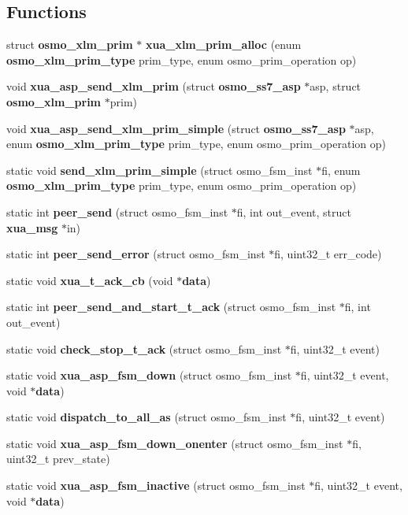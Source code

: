 \subsection*{Functions}
\begin{DoxyCompactItemize}
\item 
struct {\bf osmo\+\_\+xlm\+\_\+prim} $\ast$ {\bf xua\+\_\+xlm\+\_\+prim\+\_\+alloc} (enum {\bf osmo\+\_\+xlm\+\_\+prim\+\_\+type} prim\+\_\+type, enum osmo\+\_\+prim\+\_\+operation op)
\item 
void {\bf xua\+\_\+asp\+\_\+send\+\_\+xlm\+\_\+prim} (struct {\bf osmo\+\_\+ss7\+\_\+asp} $\ast$asp, struct {\bf osmo\+\_\+xlm\+\_\+prim} $\ast$prim)
\item 
void {\bf xua\+\_\+asp\+\_\+send\+\_\+xlm\+\_\+prim\+\_\+simple} (struct {\bf osmo\+\_\+ss7\+\_\+asp} $\ast$asp, enum {\bf osmo\+\_\+xlm\+\_\+prim\+\_\+type} prim\+\_\+type, enum osmo\+\_\+prim\+\_\+operation op)
\item 
static void {\bf send\+\_\+xlm\+\_\+prim\+\_\+simple} (struct osmo\+\_\+fsm\+\_\+inst $\ast$fi, enum {\bf osmo\+\_\+xlm\+\_\+prim\+\_\+type} prim\+\_\+type, enum osmo\+\_\+prim\+\_\+operation op)
\item 
static int {\bf peer\+\_\+send} (struct osmo\+\_\+fsm\+\_\+inst $\ast$fi, int out\+\_\+event, struct {\bf xua\+\_\+msg} $\ast$in)
\item 
static int {\bf peer\+\_\+send\+\_\+error} (struct osmo\+\_\+fsm\+\_\+inst $\ast$fi, uint32\+\_\+t err\+\_\+code)
\item 
static void {\bf xua\+\_\+t\+\_\+ack\+\_\+cb} (void $\ast${\bf data})
\item 
static int {\bf peer\+\_\+send\+\_\+and\+\_\+start\+\_\+t\+\_\+ack} (struct osmo\+\_\+fsm\+\_\+inst $\ast$fi, int out\+\_\+event)
\item 
static void {\bf check\+\_\+stop\+\_\+t\+\_\+ack} (struct osmo\+\_\+fsm\+\_\+inst $\ast$fi, uint32\+\_\+t event)
\item 
static void {\bf xua\+\_\+asp\+\_\+fsm\+\_\+down} (struct osmo\+\_\+fsm\+\_\+inst $\ast$fi, uint32\+\_\+t event, void $\ast${\bf data})
\item 
static void {\bf dispatch\+\_\+to\+\_\+all\+\_\+as} (struct osmo\+\_\+fsm\+\_\+inst $\ast$fi, uint32\+\_\+t event)
\item 
static void {\bf xua\+\_\+asp\+\_\+fsm\+\_\+down\+\_\+onenter} (struct osmo\+\_\+fsm\+\_\+inst $\ast$fi, uint32\+\_\+t prev\+\_\+state)
\item 
static void {\bf xua\+\_\+asp\+\_\+fsm\+\_\+inactive} (struct osmo\+\_\+fsm\+\_\+inst $\ast$fi, uint32\+\_\+t event, void $\ast${\bf data})

\end{DoxyCompactItemize}
